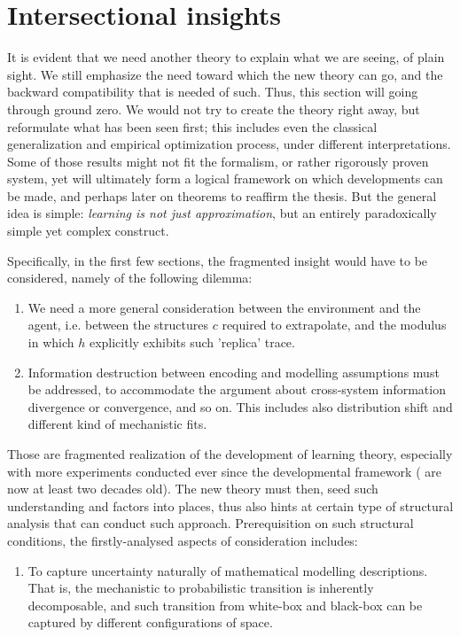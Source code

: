 \chapter{Intersectional insights}

It is evident that we need another theory to explain what we are seeing, of plain sight. We still emphasize the need toward which the new theory can go, and the backward compatibility that is needed of such. Thus, this section will going through ground zero. We would not try to create the theory right away, but reformulate what has been seen first; this includes even the classical generalization and empirical optimization process, under different interpretations. Some of those results might not fit the formalism, or rather rigorously proven system, yet will ultimately form a logical framework on which developments can be made, and perhaps later on theorems to reaffirm the thesis. But the general idea is simple: \textit{learning is not just approximation}, but an entirely paradoxically simple yet complex construct. 

Specifically, in the first few sections, the fragmented insight would have to be considered, namely of the following dilemma: 

\begin{enumerate}
    \item We need a more general consideration between the environment and the agent, i.e. between the structures $c$ required to extrapolate, and the modulus in which $h$ explicitly exhibits such 'replica' trace. 
    \item Information destruction between encoding and modelling assumptions must be addressed, to accommodate the argument about cross-system information divergence or convergence, and so on. This includes also distribution shift and different kind of mechanistic fits. 
\end{enumerate}

Those are fragmented realization of the development of learning theory, especially with more experiments conducted ever since the developmental framework (\cite{Vapnik1999-VAPTNO,10.1145/1968.1972} are now at least two decades old). The new theory must then, seed such understanding and factors into places, thus also hints at certain type of structural analysis that can conduct such approach. Prerequisition on such structural conditions, the firstly-analysed aspects of consideration includes:

\begin{enumerate}
    \item To capture uncertainty naturally of mathematical modelling descriptions. That is, the mechanistic to probabilistic transition is inherently decomposable, and such transition from white-box and black-box can be captured by different configurations of space. 
\end{enumerate}

